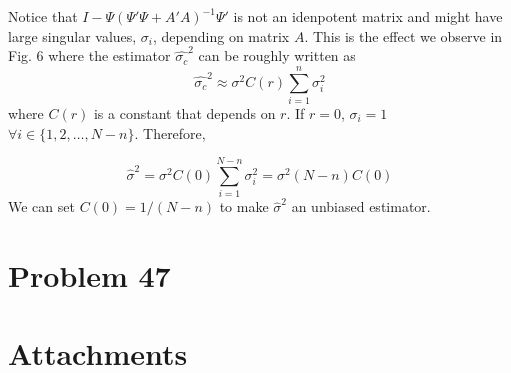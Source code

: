 \documentclass[a4paper, 11pt]{article}
\begin{document}
Notice that $I - \Psi\left(\Psi'\Psi + A'A \right)^{-1}\Psi'$ is not an idenpotent matrix and might have large singular values, $\sigma_i$, depending on matrix $A$. This is the effect we observe in Fig. 6 where the estimator $\hat{\sigma_c}^2$ can be roughly written as
\begin{equation}
\hat{\sigma_c}^2 \approx \sigma^2 C(r)\sum_{i=1}^n \sigma_i^2
\end{equation}
where $C(r)$ is a constant that depends on $r$. If $r = 0$, $\sigma_i = 1$ $\forall i \in \{1,2,\dots, N-n \}$. Therefore, 

\begin{equation}
\hat{\sigma}^2 = \sigma^2 C(0)\sum_{i=1}^{N-n} \sigma_i^2 = \sigma^2(N-n)C(0)
\end{equation}
We can set $C(0) = 1/(N-n)$ to make $\hat{\sigma}^2$ an unbiased estimator. 



\section*{Problem 47}










\section*{Attachments}
	
\end{document}
